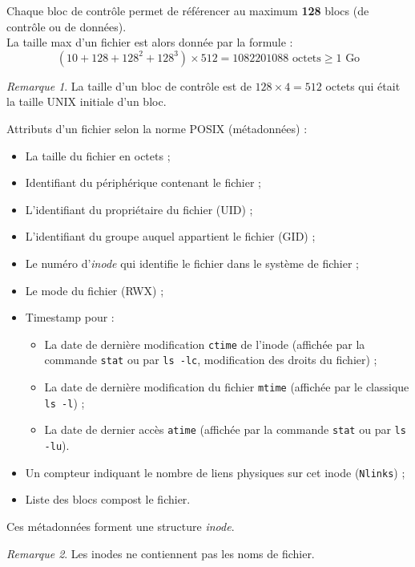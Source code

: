 \documentclass[11pt,english,french]{scrreprt}
\theoremstyle{remark}
\newtheorem*{rem*}{Remarque}
\theoremstyle{definition}
\begin{document}
Chaque bloc de contrôle permet de référencer au maximum \textbf{128} blocs (de contrôle ou de données).\\
La taille max d'un fichier est alors donnée par la formule :
\[
	\left(10+128+128^2+128^3\right)\times 512 = 1082201088 \textrm{ octets} \geqslant 1\textrm{ Go}
\]

\begin{rem*}
	La taille d'un bloc de contrôle est de $128\times 4 = 512$ octets qui était la taille UNIX initiale d'un bloc.
\end{rem*}

Attributs d'un fichier selon la norme POSIX (métadonnées) :
\begin{itemize}
	\item La taille du fichier en octets ;
	\item Identifiant du périphérique contenant le fichier ;
	\item L'identifiant du propriétaire du fichier (UID) ;
	\item L'identifiant du groupe auquel appartient le fichier (GID) ;
	\item Le numéro d'\emph{inode} qui identifie le fichier dans le système de fichier ;
	\item Le mode du fichier (RWX) ;
	\item Timestamp pour :\begin{itemize}
		\item La date de dernière modification \lstinline!ctime! de l'inode (affichée par la commande \lstinline!stat! ou par \lstinline!ls -lc!, modification des droits du fichier) ;
		\item La date de dernière modification du fichier \lstinline!mtime! (affichée par le classique \lstinline!ls -l!) ;
		\item La date de dernier accès \lstinline!atime! (affichée par la commande \lstinline!stat! ou par \lstinline!ls -lu!).
	\end{itemize}
	\item Un compteur indiquant le nombre de liens physiques sur cet inode (\lstinline!Nlinks!) ;
	\item Liste des blocs compost le fichier.
\end{itemize}
Ces métadonnées forment une structure \emph{inode}.

\begin{rem*}
	Les inodes ne contiennent pas les noms de fichier.
\end{rem*}
\end{document}
